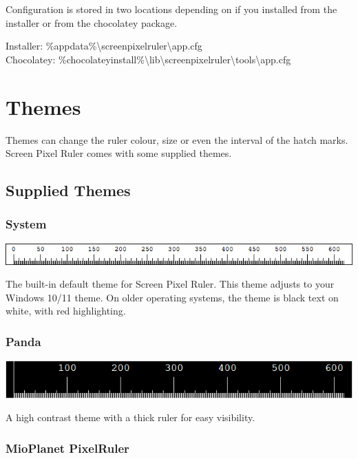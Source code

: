 \documentclass[
]{book}
\begin{document}
Configuration is stored in two locations depending on if you installed from the installer or from the chocolatey package.

Installer: \%appdata\%\textbackslash screenpixelruler\textbackslash app.cfg\\
Chocolatey: \%chocolateyinstall\%\textbackslash lib\textbackslash screenpixelruler\textbackslash tools\textbackslash app.cfg

\chapter{Themes}\label{themes}

Themes can change the ruler colour, size or even the interval of the hatch marks.
Screen Pixel Ruler comes with some supplied themes.

\section{Supplied Themes}\label{supplied-themes}

\subsection{System}\label{system}

\includegraphics{images/theme-default.png}

The built-in default theme for Screen Pixel Ruler.
This theme adjusts to your Windows 10/11 theme.
On older operating systems, the theme is black text on white, with red highlighting.

\subsection{Panda}\label{panda}

\includegraphics{images/theme-panda.png}

A high contrast theme with a thick ruler for easy visibility.

\subsection{MioPlanet PixelRuler}\label{mioplanet-pixelruler}
\end{document}
